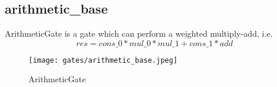 \subsection{arithmetic\_base}

ArithmeticGate is a gate which can perform a weighted multiply-add, i.e.
\[res = cons\_0 * mul\_0 * mul\_1 + cons\_1 * add\]



\begin{figure}[!h]
    \centering
    \texttt{[image: gates/arithmetic\_base.jpeg]}
    \caption{ArithmeticGate}
    \label{fig:arthmetic-gate}
\end{figure}
